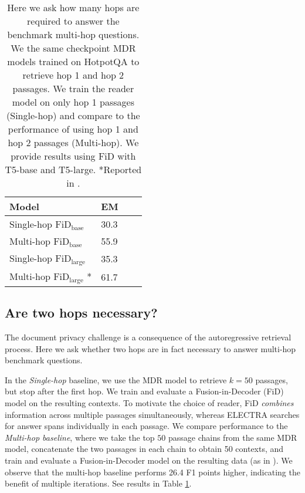 \documentclass{article}
\renewcommand\cite{\citep}	\newcommand\shortcite{\citeyearpar}\newcommand\newcite{\citet}
\begin{document}
\begin{table}[t!]
    \begin{center}
    \normalsize
    \begin{tabular}{llcc}
    \toprule
    Model  &    EM  \\
    \midrule
    Single-hop $\text{FiD}_{\text{base}}$    & 30.3  \\
    Multi-hop $\text{FiD}_{\text{base}}$     & 55.9 \\
    Single-hop $\text{FiD}_{\text{large}}$   & 35.3 \\
    Multi-hop $\text{FiD}_{\text{large}}$ *  & 61.7 \\
    \bottomrule
    \end{tabular}
    \normalsize
    \caption{Here we ask how many hops are required to answer the benchmark multi-hop questions. We the same checkpoint MDR models trained on HotpotQA to retrieve hop 1 and hop 2 passages. We train the reader model on only hop 1 passages (Single-hop) and compare to the performance of using hop 1 and hop 2 passages (Multi-hop). We provide results using FiD with T5-base and T5-large. *Reported in \cite{xiong2021mdr}.}
    \vspace{2mm}
    \label{tab:fid}
    \end{center}
\end{table}

\subsection{Are two hops necessary?} The document privacy challenge is a consequence of the autoregressive retrieval process. Here we ask whether two hops are in fact necessary to answer multi-hop benchmark questions. 

In the \textit{Single-hop} baseline, we use the MDR model to retrieve $k=50$ passages, but stop after the first hop. We train and evaluate a Fusion-in-Decoder (FiD) model \cite{izacard2021fid} on the resulting contexts. To motivate the choice of reader, FiD \textit{combines} information across multiple passages simultaneously, whereas ELECTRA searches for answer spans individually in each passage. We compare performance to the \textit{Multi-hop baseline}, where we take the top $50$ passage chains from the same MDR model, concatenate the two passages in each chain to obtain 50 contexts, and train and evaluate a Fusion-in-Decoder model on the resulting data (as in \citet{xiong2021mdr}). We observe that the multi-hop baseline performs 26.4 F1 points higher, indicating the benefit of multiple iterations. See results in Table \ref{tab:fid}.
\end{document}
